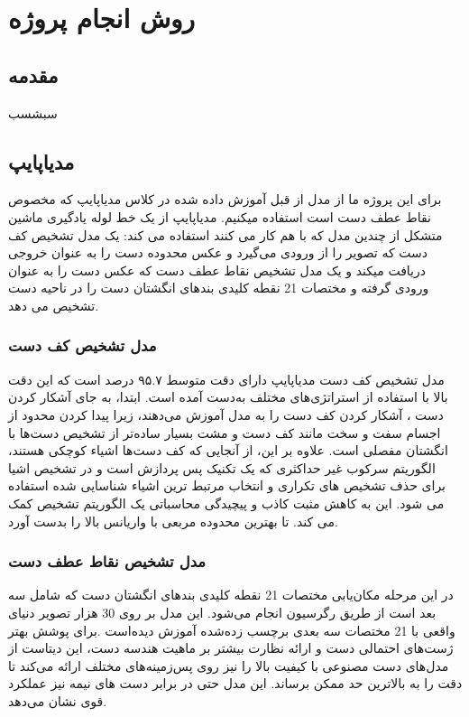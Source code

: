 \chapter{روش انجام پروژه}
\section{مقدمه}
سبشسب
\section{مدیاپایپ}
برای این پروژه ما از مدل از قبل آموزش داده شده در کلاس مدیاپایپ که مخصوص نقاط عطف دست است استفاده میکنیم. مدیاپایپ  از یک خط لوله
یادگیری ماشین متشکل از چندین مدل که با هم کار می کنند استفاده می کند: یک مدل تشخیص کف دست 
که تصویر را از ورودی می‌گیرد و  عکس محدوده دست را به عنوان خروجی دریافت میکند و یک مدل تشخیص نقاط عطف دست 
که عکس دست را به عنوان ورودی گرفته و مختصات‌ 21 نقطه کلیدی بند‌های انگشتان دست را در ناحیه دست تشخیص می دهد.

\subsection{مدل تشخیص کف دست}
مدل تشخیص کف دست مدیاپایپ دارای دقت متوسط ۹۵.۷ درصد است که این دقت بالا با استفاده از استراتژی‌های مختلف به‌دست آمده است. ابتدا، به جای آشکار کردن دست
، آشکار کردن کف دست را به مدل آموزش می‌دهند، زیرا پیدا کردن محدود از اجسام سفت و سخت مانند کف دست و مشت بسیار ساده‌تر از تشخیص دست‌ها با 
انگشتان مفصلی است. علاوه بر این، از آنجایی که کف دست‌ها اشیاء کوچکی هستند، الگوریتم سرکوب غیر حداکثری 
که یک تکنیک پس پردازش  است و در تشخیص اشیا برای حذف تشخیص های تکراری 
و انتخاب مرتبط ترین اشیاء شناسایی شده استفاده می شود. این به کاهش مثبت کاذب  و پیچیدگی محاسباتی 
یک الگوریتم تشخیص کمک می کند. تا بهترین محدوده مربعی  با واریانس بالا  را بدست آورد. \cite{zhang2020mediapipe}

\subsection{مدل تشخیص نقاط عطف دست}
در این مرحله مکان‌یابی مختصات 21 نقطه کلیدی بند‌های انگشتان دست که شامل سه بعد است از طریق رگرسیون 
انجام می‌شود. این مدل بر روی 30 هزار تصویر دنیای واقعی با 21 مختصات سه بعدی برچسب زده‌شده 
آموزش دیده‌است .برای پوشش بهتر ژست‌های احتمالی دست و ارائه نظارت بیشتر بر ماهیت هندسه دست، این دیتاست از مدل‌های دست مصنوعی
با کیفیت بالا را نیز روی پس‌زمینه‌های مختلف ارائه می‌کند تا دقت را به بالاترین حد ممکن برساند. این مدل حتی در برابر دست های نیمه نیز عملکرد قوی نشان می‌دهد. \cite{zhang2020mediapipe}

